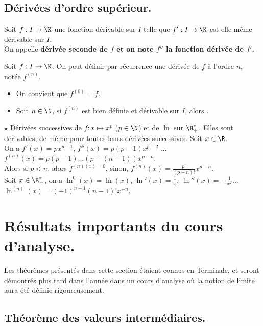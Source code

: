 \documentclass[11pt]{article}
\begin{document}
\subsection{Dérivées d'ordre supérieur.}

\begin{defi}{}{}
    Soit $f:I\to\K$ une fonction dérivable sur $I$ telle que $f':I\to\K$ est elle-même dérivable sur $I$.\\
    On appelle \bf{dérivée seconde de} $f$ et on note $f''$ la fonction dérivée de $f'$.
\end{defi}

\begin{defi}{}{}
    Soit $f:I\to\K$. On peut définir par récurrence une dérivée de $f$ à l'ordre $n$, notée $f^{(n)}$.
    \begin{itemize}
        \item On convient que $f^{(0)}=f$.
        \item Soit $n\in\N$, si $f^{(n)}$ est bien définie et dérivable sur $I$, alors .
    \end{itemize}
\end{defi}

\begin{ex}{$\star$}{}
    Dérivées successives de $f:x\mapsto x^p$ ($p\in\N$) et de $\ln$ sur $\R_+^*$.
    \tcblower
    Elles sont dérivables, de même pour toutes leurs dérivées successives. Soit $x\in\R$.\\
    On a $f'(x)=px^{p-1}$, $f''(x)=p(p-1)x^{p-2}$ ... $f^{(n)}(x)=p(p-1)...(p-(n-1))x^{p-n}$.\\
    Alors si $p<n$, alors $f^{(n)(x)=0}$, sinon, $f^{(n)}(x)=\frac{p!}{(p-n)!}x^{p-n}$.\\
    Soit $x\in\R_+^*$, on a $\ln^0(x)=\ln(x)$, $\ln'(x)=\frac{1}{x}$, $\ln''(x)=-\frac{1}{x^2}$... $\ln^{(n)}(x)=(-1)^{n-1}(n-1)!x^{-n}$. 
\end{ex}

\section{Résultats importants du cours d'analyse.}
Les théorèmes présentés dans cette section étaient connus en Terminale, et seront démontrés plus tard dans l'année dans un cours d'analyse où la notion de limite aura été définie rigoureusement.
\subsection{Théorème des valeurs intermédiaires.}
\end{document}
